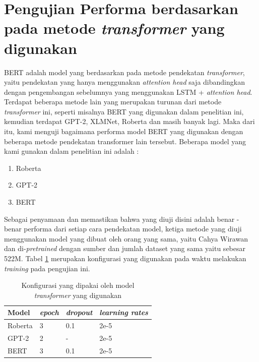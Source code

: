 \section{Pengujian Performa berdasarkan pada metode \textit{transformer} yang digunakan}

BERT adalah model yang berdasarkan pada metode pendekatan \textit{transformer}, yaitu pendekatan yang hanya menggunakan \textit{attention head} saja dibandingkan dengan pengembangan sebelumnya yang menggunakan LSTM + \textit{attention head}. Terdapat beberapa metode lain yang merupakan turunan dari metode \textit{transformer} ini, seperti misalnya BERT yang digunakan dalam penelitian ini, kemudian terdapat GPT-2, XLMNet, Roberta dan masih banyak lagi. Maka dari itu, kami menguji bagaimana performa model BERT yang digunakan dengan beberapa metode pendekatan transformer lain tersebut. Beberapa model yang kami gunakan dalam penelitian ini adalah :

\begin{enumerate}[nolistsep]
    \item Roberta
    \item GPT-2
    \item BERT
\end{enumerate}

Sebagai penyamaan dan memastikan bahwa yang diuji disini adalah benar - benar performa dari setiap cara pendekatan model, ketiga metode yang diuji menggunakan model yang dibuat oleh orang yang sama, yaitu Cahya Wirawan dan di-\textit{pretrained} dengan sumber dan jumlah dataset yang sama yaitu sebesar 522M. Tabel \ref{tab: transformer_config} merupakan konfigurasi yang digunakan pada waktu melakukan \textit{training} pada pengujian ini.

\begin{table}[h]
    \centering
    \caption{Konfigurasi yang dipakai oleh model \textit{transformer} yang digunakan}
    \label{tab: transformer_config}
    \begin{tabular}{|l|l|l|l|}
        \hline
        \textbf{Model} & \textit{\textbf{epoch}} & \textit{\textbf{dropout}} & \textit{\textbf{learning rates}} \\ \hline
        Roberta        & 3                       & 0.1                       & 2e-5                             \\ \hline
        GPT-2          & 2                       & -                         & 2e-5                             \\ \hline
        BERT           & 3                       & 0.1                       & 2e-5                             \\ \hline
    \end{tabular}
\end{table}

